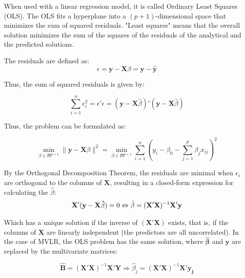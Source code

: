 \documentclass[12pt]{article}
\begin{document}
{When used with a linear regression model, it is called Ordinary Least Squares (OLS). The OLS fits a hyperplane into a $(p+1)$-dimensional space that minimizes the sum of squared residuals. "Least squares" means that the overall solution minimizes the sum of the squares of the residuals of the analytical and the predicted solutions. 
	
	The residuals are defined as:
    \begin{equation} \label{eq:residuals}
    \epsilon=\mathbf{y} - \mathbf{X}\beta = \mathbf{y} - \mathbf{\hat y}
	\end{equation}
	
	Thus, the sum of squared residuals is given by:

	
	\begin{equation}
	 \sum^{n}_{i=1}  \epsilon^{2}_{i} = \epsilon'\epsilon = (\mathbf{y} - \mathbf{X}\hat \beta)'(\mathbf{y} - \mathbf{X}\hat \beta)
	\end{equation}
	
	Thus, the problem can be formulated as:
	
	\begin{equation}
	\min_{\beta \in \Re^{p+1}}  \| \mathbf{y}-\mathbf{X}\beta \|^{2} = \min_{\beta \in \Re^{p+1}} \sum^{n}_{i=1}(y_{i}-\beta_{0}-\sum^{p}_{j=1}\beta_{j}x_{ij})^{2}
	\end{equation}
	
\vspace{0.5cm}
By the Orthogonal Decomposition Theorem, the residuals are minimal when $\epsilon_{i}$ are orthogonal to the columns of $\mathbf{X}$, resulting in a closed-form expression for calculating the $\hat \beta$:
	\begin{equation} \label{eq:betas2}
    \mathbf{X}'(\mathbf{y - \mathbf{X}\hat \beta}) = 0 \\ 
    \Leftrightarrow \hat \beta = (\mathbf{X}' \mathbf{X})^{-1}\mathbf{X}'\mathbf{y}
    \end{equation}

Which has a unique solution if the inverse of $(\mathbf{X}' \mathbf{X})$ exists, that is, if the columns of $\mathbf{X}$ are linearly independent (the predictors are all uncorrelated). In the case of MVLR, the OLS problem has the  same solution, where $\mathbf{\hat \beta}$ and $\mathbf{y}$ are replaced by the multivariate matrices:

\begin{equation} \label{eq:betas3}
 \mathbf{\hat B} = (\mathbf{X}' \mathbf{X})^{-1}\mathbf{X}'\mathbf{Y}
 \Rightarrow \hat \beta_{j} = (\mathbf{X}' \mathbf{X})^{-1}\mathbf{X}'\mathbf{y_{j}}
\end{equation}

}
\end{document}
